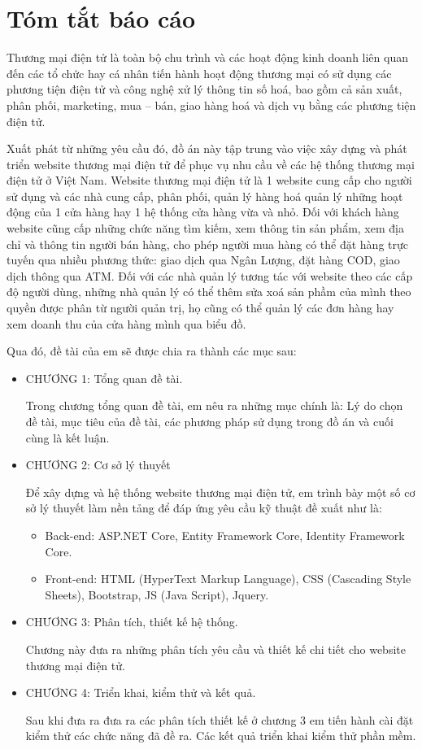 \chapter*{Tóm tắt báo cáo}
Thương mại điện tử là toàn bộ chu trình và các hoạt động kinh doanh liên quan đến các tổ chức hay cá nhân tiến hành hoạt động thương mại có sử dụng các phương tiện điện tử và công nghệ xử lý thông tin số hoá, bao gồm cả sản xuất, phân phối, marketing, mua – bán, giao hàng hoá và dịch vụ bằng các phương tiện điện tử.
\par
Xuất phát từ những yêu cầu đó, đồ án này tập trung vào việc xây dựng và phát triển website thương mại điện tử để phục vụ nhu cầu về các hệ thống thương mại điện tử ở Việt Nam. Website thương mại điện tử là 1 website cung cấp cho người sử dụng và các nhà cung cấp, phân phối, quản lý hàng hoá quản lý những hoạt động của 1 cửa hàng hay 1 hệ thống cửa hàng vừa và nhỏ. Đối với khách hàng website cũng cấp những chức năng tìm kiếm, xem thông tin sản phẩm, xem địa chỉ và thông tin người bán hàng, cho phép người mua hàng có thể đặt hàng trực tuyến qua nhiều phương thức: giao dịch qua Ngân Lượng, đặt hàng COD, giao dịch thông qua ATM. Đối với các nhà quản lý tương tác với website theo các cấp độ người dùng, những nhà quản lý có thể thêm sửa xoá sản phầm của mình theo quyền được phân từ người quản trị, họ cũng có thể quản lý các đơn hàng hay xem doanh thu của cửa hàng mình qua biểu đồ.
\par 
Qua đó, đề tài của em sẽ được chia ra thành các mục sau:
\begin{itemize}
\item CHƯƠNG 1: Tổng quan đề tài.
\par
Trong chương tổng quan đề tài, em nêu ra những mục chính là: Lý do chọn đề tài, mục tiêu của đề tài, các phương pháp sử dụng trong đồ án và cuối cùng là kết luận.
\item CHƯƠNG 2: Cơ sở lý thuyết
\par
Để xây dựng và hệ thống website thương mại điện tử, em trình bày một số cơ sở lý thuyết làm nền tảng để đáp ứng yêu cầu kỹ thuật đề xuất như là: 
\begin{itemize}
\item Back-end: ASP.NET Core, Entity Framework Core, Identity Framework Core.
\item Front-end: HTML (HyperText Markup Language), CSS (Cascading Style Sheets), Bootstrap, JS (Java Script), Jquery.
\end{itemize}
\item CHƯƠNG 3: Phân tích, thiết kế hệ thống.\par
Chương này đưa ra những phân tích yêu cầu và thiết kế chi tiết cho website thương mại điện tử.

\item CHƯƠNG 4: Triển khai, kiểm thử và kết quả.\par
Sau khi đưa ra đưa ra các phân tích thiết kế ở chương 3 em tiến hành cài đặt kiểm thử các chức năng đã đề ra. Các kết quả triển khai kiểm thử phần mềm.

\end{itemize}

